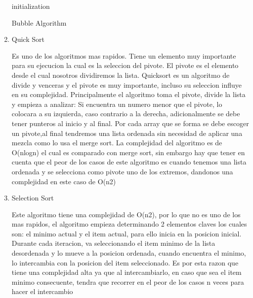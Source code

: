 \documentclass[12pt]{article} %
\begin{document}
\begin{enumerate}
          \begin{algorithm}[H]
              initialization\;
              \caption{Bubble Algorithm}
          \end{algorithm}

    \item Quick Sort
    
          Es uno de los algoritmos mas rapidos. Tiene un elemento muy importante para su ejecucion la cual es la seleccion del pivote. El pivote es el elemento desde el cual nosotros dividiremos la lista.
          Quicksort es un algoritmo de divide y venceras y el pivote es muy importante, incluso su seleccion influye en su complejidad. Principalmente el algoritmo toma el pivote, divide la lista y empieza a analizar:
          Si encuentra un numero menor que el pivote, lo colocara a su izquierda, caso contrario a la derecha, adicionalmente se debe tener punteros al inicio y al final.
          Por cada array que se forma se debe escoger un pivote,al final tendremos una lista ordenada sin necesidad de aplicar una mezcla como lo usa el merge sort.
          La complejidad del algoritmo es de O(nlogn) el cual es comparado con merge sort, sin embargo hay que tener en cuenta que el peor de los casos de este algoritmo es cuando
          tenemos una lista ordenada y se selecciona como pivote uno de los extremos, dandonos una complejidad en este caso de O(n2)

    \item Selection Sort
    
          Este algoritmo tiene una complejidad de O(n2), por lo que no es uno de los mas rapidos, el algoritmo empieza determinando 2 elementos claves
          los cuales son: el minimo actual y el item actual, para ello inicia en la posicion inicial. Durante cada iteracion, va seleccionando el item minimo
          de la lista desordenada y lo mueve a la posicion ordenada, cuando encuentra el minimo, lo intercambia con la posicion del item seleccionado. Es por esta razon que
          tiene una complejidad alta ya que al intercambiarlo, en caso que sea el item minimo consecuente, tendra que recorrer en el peor de los casos n veces para hacer el intercambio




\end{enumerate}
\end{document}
